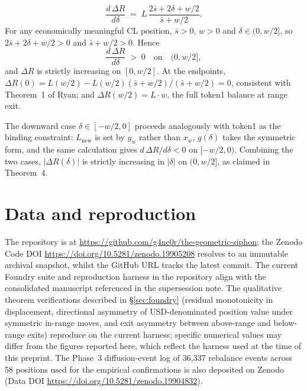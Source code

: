 \documentclass[11pt,a4paper]{article}
\theoremstyle{definition}
\begin{document}
\begin{equation}
\frac{d\,\Delta R}{d\delta} \;=\; L\,\frac{2\bar{s} + 2\delta + w/2}{\bar{s} + w/2}.
\end{equation}
For any economically meaningful CL position, $\bar{s} > 0$, $w > 0$ and $\delta \in (0, w/2]$, so $2\bar{s} + 2\delta + w/2 > 0$ and $\bar{s} + w/2 > 0$. Hence
\begin{equation}
\frac{d\,\Delta R}{d\delta} \;>\; 0 \quad\text{on}\quad (0, w/2],
\end{equation}
and $\Delta R$ is strictly increasing on $[0, w/2]$. At the endpoints, $\Delta R(0) = L(w/2) - L(w/2)(\bar{s} + w/2)/(\bar{s} + w/2) = 0$, consistent with Theorem~1 of Ryan\cite{ryan2026a}; and $\Delta R(w/2) = L \cdot w$, the full token1 balance at range exit.

The downward case $\delta \in [-w/2, 0]$ proceeds analogously with token1 as the binding constraint: $L_{\text{new}}$ is set by $y_w$ rather than $x_w$, $g(\delta)$ takes the symmetric form, and the same calculation gives $d\,\Delta R/d\delta < 0$ on $[-w/2, 0)$. Combining the two cases, $|\Delta R(\delta)|$ is strictly increasing in $|\delta|$ on $(0, w/2]$, as claimed in Theorem~4.

\section{Data and reproduction}\label{app:reproduction}

The repository is at \url{https://github.com/g4nc0r/the-geometric-siphon}; the Zenodo Code DOI \url{https://doi.org/10.5281/zenodo.19905208} resolves to an immutable archival snapshot, whilst the GitHub URL tracks the latest commit. The current Foundry suite and reproduction harness in the repository align with the consolidated manuscript referenced in the supersession note. The qualitative theorem verifications described in \S\ref{sec:foundry} (residual monotonicity in displacement, directional asymmetry of USD-denominated position value under symmetric in-range moves, and exit asymmetry between above-range and below-range exits) reproduce on the current harness; specific numerical values may differ from the figures reported here, which reflect the harness used at the time of this preprint. The Phase~3 diffusion-event log of 36{,}337 rebalance events across 58 positions used for the empirical confirmations is also deposited on Zenodo (Data DOI \url{https://doi.org/10.5281/zenodo.19904832}).
\end{document}
